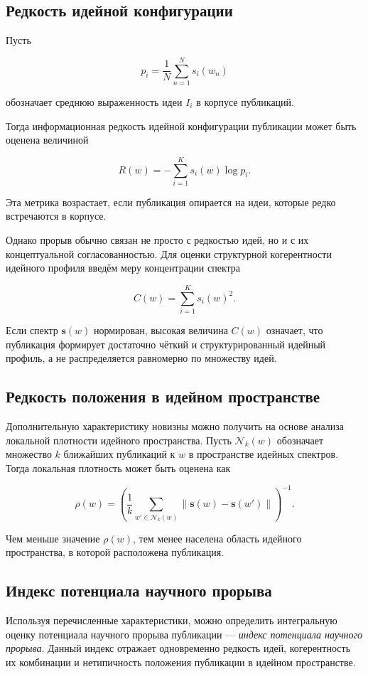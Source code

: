 \documentclass[review,3p,times]{elsarticle}
\begin{document}
\subsection{Редкость идейной конфигурации}

Пусть

\[
p_i=\frac{1}{N}\sum_{n=1}^{N}s_i(w_n)
\]

обозначает среднюю выраженность идеи $I_i$ в корпусе публикаций.

Тогда информационная редкость идейной конфигурации публикации может быть оценена величиной

\[
R(w)=-\sum_{i=1}^{K}s_i(w)\log p_i.
\]

Эта метрика возрастает, если публикация опирается на идеи, которые редко встречаются в корпусе.

Однако прорыв обычно связан не просто с редкостью идей, но и с их концептуальной согласованностью. Для оценки структурной когерентности идейного профиля введём меру концентрации спектра

\[
C(w)=\sum_{i=1}^{K}s_i(w)^2.
\]

Если спектр $\mathbf{s}(w)$ нормирован, высокая величина $C(w)$ означает, что публикация формирует достаточно чёткий и структурированный идейный профиль, а не распределяется равномерно по множеству идей.

\subsection{Редкость положения в идейном пространстве}

Дополнительную характеристику новизны можно получить на основе анализа локальной плотности идейного пространства. Пусть $\mathcal{N}_k(w)$ обозначает множество $k$ ближайших публикаций к $w$ в пространстве идейных спектров. Тогда локальная плотность может быть оценена как

\[
\rho(w)=
\left(
\frac{1}{k}\sum_{w'\in \mathcal{N}_k(w)}
\|\mathbf{s}(w)-\mathbf{s}(w')\|
\right)^{-1}.
\]

Чем меньше значение $\rho(w)$, тем менее населена область идейного пространства, в которой расположена публикация.

\subsection{Индекс потенциала научного прорыва}

Используя перечисленные характеристики, можно определить интегральную оценку потенциала научного прорыва публикации — \emph{индекс потенциала научного прорыва}. Данный индекс отражает одновременно редкость идей, когерентность их комбинации и нетипичность положения публикации в идейном пространстве.
\end{document}
